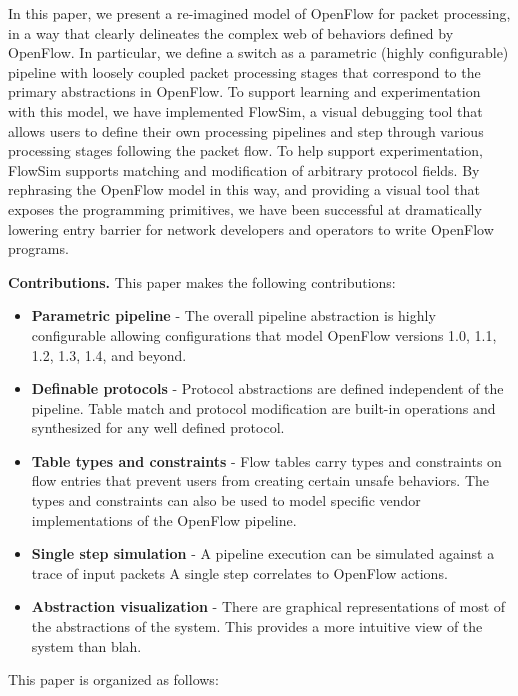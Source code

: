In this paper, we present a re-imagined model of OpenFlow for
packet processing, in a way that clearly delineates the complex web of behaviors
defined by OpenFlow. In particular, we define a switch as a parametric (highly 
configurable) pipeline with loosely coupled packet processing stages that 
correspond to the primary abstractions in OpenFlow. To support learning and 
experimentation with this model, we have implemented FlowSim, a visual debugging
tool that allows users to define their own processing pipelines and step through
various processing stages following the packet flow. To help support 
experimentation, FlowSim supports matching and modification of arbitrary 
protocol fields. By rephrasing the OpenFlow model in this way, and providing a 
visual tool that exposes the programming primitives, we have been successful
at dramatically lowering entry barrier for network developers and operators to 
write OpenFlow programs.


\textbf{Contributions.} This paper makes the following contributions:
\begin{itemize}
  \item \textbf{Parametric pipeline} - The overall pipeline abstraction is
        highly configurable allowing configurations that model OpenFlow 
        versions 1.0, 1.1, 1.2, 1.3, 1.4, and beyond.
  \item \textbf{Definable protocols} - Protocol abstractions are defined 
        independent of the pipeline. Table match and protocol modification are
        built-in operations and synthesized for any well defined protocol.
  \item \textbf{Table types and constraints} - Flow tables carry types and
        constraints on flow entries that prevent users from creating certain
        unsafe behaviors. The types and constraints can also be used to model
        specific vendor implementations of the OpenFlow pipeline.
  \item \textbf{Single step simulation} - A pipeline execution can be simulated
        against a trace of input packets A single step correlates to OpenFlow
        actions.
  \item \textbf{Abstraction visualization} - There are graphical representations
        of most of the abstractions of the system. This provides a more intuitive
        view of the system than blah.
\end{itemize}

This paper is organized as follows:
